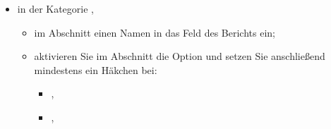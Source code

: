 \begin{enumerate}
\begin{itemize}
\begin{itemize}
			\item wählen Sie in der Dropdown-Liste mit der Bezeichnung  die Option  aus,
			\item und geben Sie dann die gesuchte Abstimmungsnummer in das Feld mit der Bezeichnung  ein;
		\end{itemize}
		\item in der Kategorie ,
		\begin{itemize}
			\item im Abschnitt  einen Namen in das Feld  des Berichts ein;
			\item aktivieren Sie im Abschnitt  die Option  und setzen Sie anschließend mindestens ein Häkchen bei:
			\begin{itemize}
				\item {},
				\item {},

\end{itemize}
\end{itemize}
\end{itemize}
\end{enumerate}
